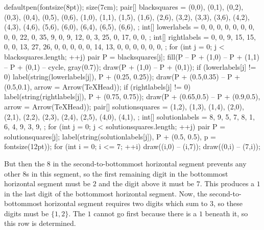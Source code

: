 	\begin{center}
		\begin{asy}
			defaultpen(fontsize(8pt));
			size(7cm);
			pair[] blacksquares = {
				(0,0), (0,1), (0,2), (0,3), (0,4), (0,5), (0,6),
				(1,0), (1,1), (1,5), (1,6),
				(2,6),
				(3,2), (3,3), (3,6),
				(4,2), (4,3), (4,6),
				(5,6),
				(6,0), (6,4), (6,5), (6,6),
			};
			int[] lowerlabels = {
				0, 0, 0, 0, 0, 0, 0,
				0, 0, 22, 0,
				35,
				9, 0, 9,
				12, 0, 3,
				25,
				0, 17, 0, 0,
			};
			int[] rightlabels = {
				0, 0, 9, 15, 15, 0, 0,
				13, 27, 26, 0,
				0,
				0, 0, 0,
				14, 13, 0,
				0,
				0, 0, 0, 0,
			};
			for (int j = 0; j < blacksquares.length; ++j) {
				pair P = blacksquares[j];
				fill(P -- P + (1,0) -- P + (1,1) -- P + (0,1) -- cycle, gray(0.7));
				draw(P + (1,0) -- P + (0,1));
				if (lowerlabels[j] != 0) {
					label(string(lowerlabels[j]), P + (0.25, 0.25));
					draw(P + (0.5,0.35) -- P + (0.5,0.1), arrow = Arrow(TeXHead));
				}
				if (rightlabels[j] != 0) {
					label(string(rightlabels[j]), P + (0.75, 0.75));
					draw(P + (0.65,0.5) -- P + (0.9,0.5), arrow = Arrow(TeXHead));
				}
			}
			pair[] solutionsquares = {
				(1,2), (1,3), (1,4),
				(2,0), (2,1), (2,2), (2,3), (2,4), (2,5),
				(4,0), (4,1),
			};
			int[] solutionlabels = {
				8, 9, 5,
				7, 8, 1, 6, 4, 9,
				3, 9,
			};
			for (int j = 0; j < solutionsquares.length; ++j) {
				pair P = solutionsquares[j];
				label(string(solutionlabels[j]), P + (0.5, 0.5), p = fontsize(12pt));
			}
			for (int i = 0; i <= 7; ++i) {
				draw((i,0) -- (i,7));
				draw((0,i) -- (7,i));
			}
		\end{asy}
	\end{center}
	But then the $8$ in the second-to-bottommost horizontal segment prevents any other $8$s in this segment, so the first remaining digit in the bottommost horizontal segment must be $2$ and the digit above it must be $7$. This produces a $1$ in the last digit of the bottommost horizontal segment. Now, the second-to-bottommost horizontal segment requires two digits which sum to $3$, so these digits must be $\{1,2\}$. The $1$ cannot go first because there is a $1$ beneath it, so this row is determined.

